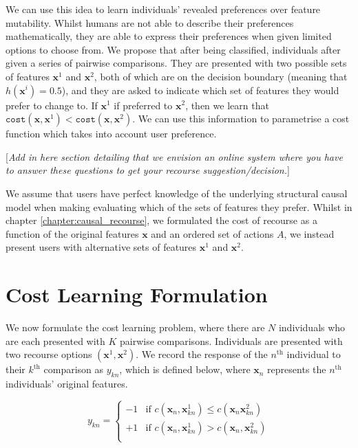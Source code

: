 We can use this idea to learn individuals' revealed preferences over feature mutability. Whilst humans are not able to describe their preferences mathematically, they are able to express their preferences when given limited options to choose from. We propose that after being classified, individuals after given a series of pairwise comparisons. They are presented with two possible sets of features $\mathbf{x}^1$ and $\mathbf{x}^2$, both of which are on the decision boundary (meaning that $h(\mathbf{x}^i)=0.5$), and they are asked to indicate which set of features they would prefer to change to. If $\mathbf{x}^1$ if preferred to $\mathbf{x}^2$, then we learn that $\texttt{cost}(\mathbf{x}, \mathbf{x}^1) < \texttt{cost}(\mathbf{x}, \mathbf{x}^2)$. We can use this information to parametrise a cost function which takes into account user preference.

[\textit{Add in here section detailing that we envision an online system where you have to answer these questions to get your recourse suggestion/decision.}]

We assume that users have perfect knowledge of the underlying structural causal model when making evaluating which of the sets of features they prefer. Whilst in chapter \ref{chapter:causal_recourse}, we formulated the cost of recourse as a function of the original features $\mathbf{x}$ and an ordered set of actions $A$, we instead present users with alternative sets of features $\mathbf{x}^1$ and $\mathbf{x}^2$.

\section{Cost Learning Formulation}

We now formulate the cost learning problem, where there are $N$ individuals who are each presented with $K$ pairwise comparisons. Individuals are presented with two recourse options $(\mathbf{x}^1, \mathbf{x}^2)$. We record the response of the $n^{\text{th}}$ individual to their $k^{\text{th}}$ comparison as $y_{kn}$, which is defined below, where $\mathbf{x}_n$ represents the $n^{\text{th}}$ individuals' original features.

\begin{equation} \label{eq:paired_response}
	y_{kn} = \begin{cases}
		-1 & \text{if } c(\mathbf{x}_n, \mathbf{x}^1_{kn}) \leq c(\mathbf{x}_n \mathbf{x}^2_{kn}) \\
		+1 & \text{if }  c(\mathbf{x}_n, \mathbf{x}^1_{kn}) > c(\mathbf{x}_n, \mathbf{x}^2_{kn}) \\
	\end{cases}
\end{equation}



